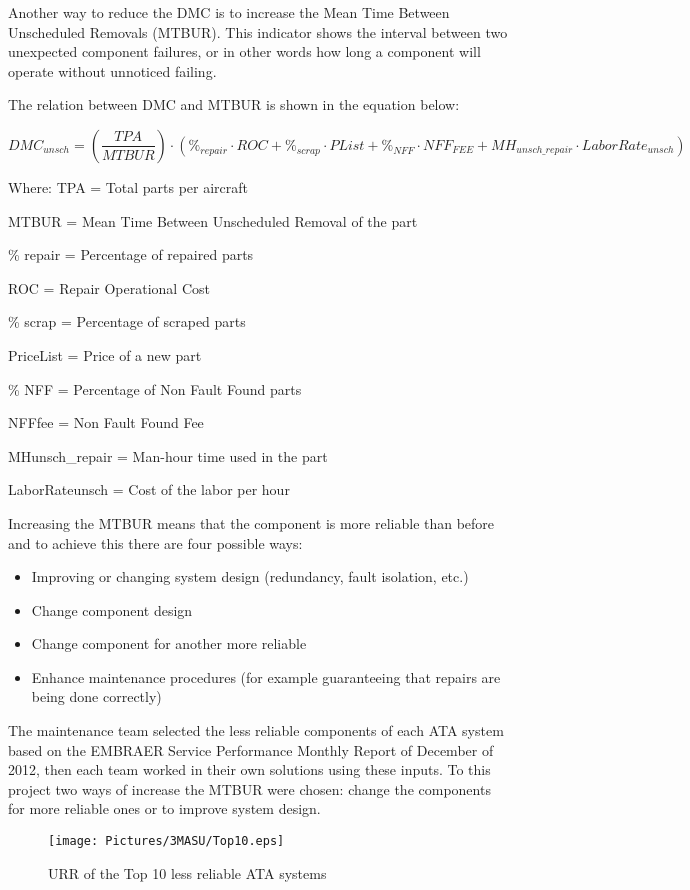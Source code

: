 
Another way to reduce the DMC is to increase the Mean Time Between Unscheduled Removals (MTBUR). This indicator shows the interval between two unexpected component failures, or in other words how long a component will operate without unnoticed failing.

The relation between DMC and MTBUR is shown in the equation below:

\[DMC_{unsch} =\left(\frac{TPA}{MTBUR} \right)\cdot \left(\% _{repair} \cdot ROC+\% _{scrap} \cdot PList+\% _{NFF} \cdot NFF_{FEE} +MH_{unsch\_ repair} \cdot LaborRate_{unsch} \right)\]

Where:
	TPA = Total parts per aircraft

	MTBUR = Mean Time Between Unscheduled Removal of the part

	\% repair = Percentage of repaired parts

	ROC = Repair Operational Cost

	\% scrap = Percentage of scraped parts

	PriceList = Price of a new part

	\% NFF = Percentage of Non Fault Found parts

	NFFfee = Non Fault Found Fee

    MHunsch\_repair = Man-hour time used in the part

    LaborRateunsch = Cost of the labor per hour

Increasing the MTBUR means that the component is more reliable than before and to achieve this there are four possible ways:

\begin{itemize}
	\item Improving or changing system design (redundancy, fault isolation, etc.)
	\item Change component design
	\item Change component for another more reliable
	\item Enhance maintenance procedures (for example guaranteeing that repairs are being done correctly)
\end{itemize}

The maintenance team selected the less reliable components of each ATA system based on the EMBRAER Service Performance Monthly Report of December of 2012, then each team worked in their own solutions using these inputs. To this project two ways of increase the MTBUR were chosen: change the components for more reliable ones or to improve system design.

\begin{figure}[H]
	\centering
	\texttt{[image: Pictures/3MASU/Top10.eps]}
	\caption{URR of the Top 10 less reliable ATA systems}
	\label{fig:Top10Maintenance}
\end{figure}

